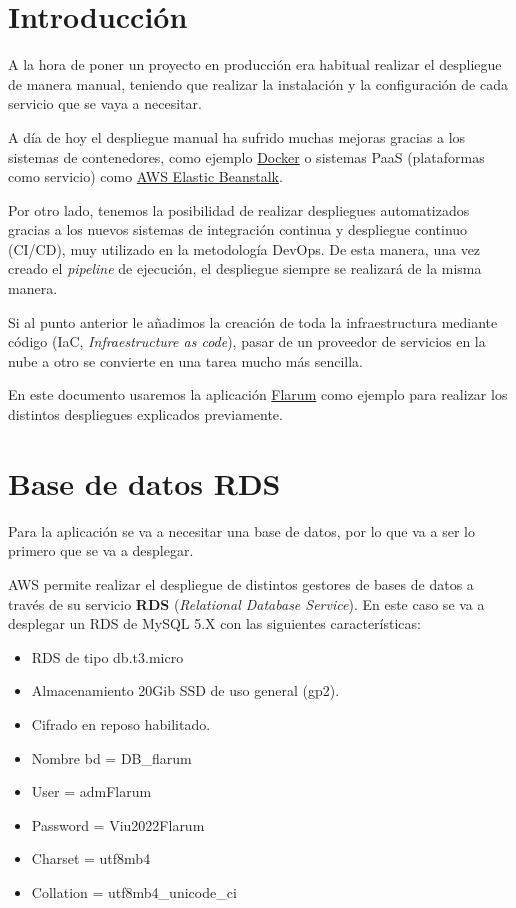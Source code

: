 \documentclass{\ClassPath/viu-tfm-template}
\begin{document}
    \graphicspath{{../VIU_TFM_LaTeX_template/}}

    \coverpage

    \tableofcontents

\chapter{Introducción}

A la hora de poner un proyecto en producción era habitual realizar el despliegue de manera manual, teniendo que realizar la instalación y la configuración de cada servicio que se vaya a necesitar.

A día de hoy el despliegue manual ha sufrido muchas mejoras gracias a los sistemas de contenedores, como ejemplo \href{https://www.docker.com/}{Docker} o sistemas PaaS (plataformas como servicio) como \href{https://en.wikipedia.org/wiki/AWS_Elastic_Beanstalk}{AWS Elastic Beanstalk}.

Por otro lado, tenemos la posibilidad de realizar despliegues automatizados gracias a los nuevos sistemas de integración continua y despliegue continuo (CI/CD), muy utilizado en la metodología DevOps. De esta manera, una vez creado el \textit{pipeline} de ejecución, el despliegue siempre se realizará de la misma manera.

Si al punto anterior le añadimos la creación de toda la infraestructura mediante código (IaC, \textit{Infraestructure as code}), pasar de un proveedor de servicios en la nube a otro se convierte en una tarea mucho más sencilla.

En este documento usaremos la aplicación \href{https://flarum.org/}{Flarum} como ejemplo para realizar los distintos despliegues explicados previamente.


\chapter{Base de datos RDS}
Para la aplicación se va a necesitar una base de datos, por lo que va a ser lo primero que se va a desplegar.

AWS permite realizar el despliegue de distintos gestores de bases de datos a través de su servicio \textbf{RDS} (\textit{Relational Database Service}). En este caso se va a desplegar un RDS de MySQL 5.X con las siguientes características:

\begin{itemize}
    \item RDS de tipo db.t3.micro
    \item Almacenamiento 20Gib SSD de uso general (gp2).
    \item Cifrado en reposo habilitado.
    \item Nombre bd = DB\_flarum
    \item User = admFlarum
    \item Password = Viu2022Flarum
    \item Charset = utf8mb4
    \item Collation = utf8mb4\_unicode\_ci
\end{itemize}
\end{document}
